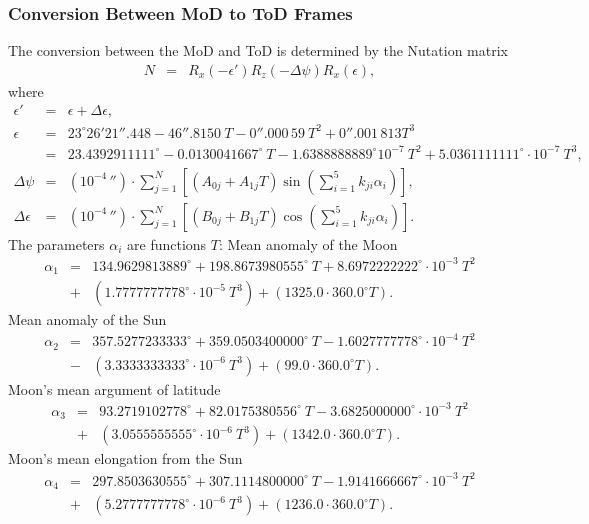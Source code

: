 \documentclass [12pt, a4paper] {article}
\begin{document}
\subsubsection{Conversion Between MoD to ToD Frames}
The conversion between the MoD and ToD is determined by the Nutation matrix 
\begin {eqnarray}
  N &=& R_x(-\epsilon')R_z(-\Delta\psi)R_x(\epsilon),
\end {eqnarray}
where 
\begin {eqnarray}
  \epsilon' &=& \epsilon + \Delta\epsilon, \\
  \epsilon &=& 23^\circ 26'21''.448 - 46''.8150\:T - 0''.000\,59\:T^2 + 0''.001\,813T^3
  \\
  \nonumber &=& 
  23.4392911111^\circ - 0.0130041667^\circ\:T - 1.6388888889^\circ 10^{-7}\:T^2 
  + 5.0361111111^\circ\cdot 10^{-7}\:T^3,
  \\
  \Delta\psi &=& (10^{-4}\,'') \cdot
  \sum_{j=1}^N 
  \left[
    \left(A_{0j} + A_{1j}T\right)\sin\left(\sum_{i=1}^5 k_{ji}\alpha_i\right)
  \right], 
  \\
  \Delta\epsilon &=& (10^{-4}\,'') \cdot
  \sum_{j=1}^N 
  \left[
    \left(B_{0j} + B_{1j}T\right)\cos\left(\sum_{i=1}^5 k_{ji}\alpha_i\right)
  \right].
\end {eqnarray}
The parameters $\alpha_i$ are functions $T$:
Mean anomaly of the Moon 
\begin {eqnarray}
  \alpha_1 &=& 134.9629813889^\circ + 198.8673980555^\circ\:T + 8.6972222222^\circ\cdot 10^{-3}\:T^2 
   \\\nonumber &+& (1.7777777778^\circ\cdot 10^{-5}\:T^3) 
        + (1325.0 \cdot 360.0^\circ T).
\end {eqnarray}
Mean anomaly of the Sun
\begin {eqnarray}
  \alpha_2 &=& 357.5277233333^\circ + 359.0503400000^\circ\:T - 1.6027777778^\circ\cdot 10^{-4}\:T^2 
   \\\nonumber &-& (3.3333333333^\circ\cdot 10^{-6}\:T^3) 
        + (99.0 \cdot 360.0^\circ T).
\end {eqnarray}
Moon's mean argument of latitude
\begin {eqnarray}        
  \alpha_3 &=&  93.2719102778^\circ + 82.0175380556^\circ\:T   - 3.6825000000^\circ\cdot 10^{-3}\:T^2 
  \\\nonumber &+& (3.0555555555^\circ\cdot 10^{-6}\:T^3)
        + (1342.0 \cdot 360.0^\circ T).
\end {eqnarray}
Moon's mean elongation from the Sun
\begin {eqnarray}        
  \alpha_4 &=& 297.8503630555^\circ + 307.1114800000^\circ\:T  - 1.9141666667^\circ\cdot 10^{-3}\:T^2 
  \\\nonumber &+& (5.2777777778^\circ\cdot 10^{-6}\:T^3)
        + (1236.0 \cdot 360.0^\circ T).
\end {eqnarray}
\end{document}
